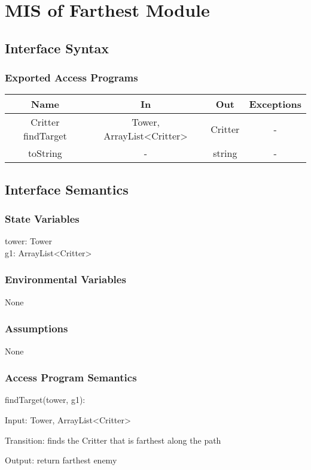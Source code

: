 \documentclass[12,english]{article}
\begin{document}
\section{MIS of Farthest Module}
	\subsection{Interface Syntax}
		\subsubsection{Exported Access Programs}
		
	\begin{tabular}[pos]{|c|c|c|c|}
	\hline
	\textbf{Name}& \textbf{In} & \textbf{Out} & \textbf{Exceptions} \\ 
	\hline
	Critter findTarget & Tower, ArrayList<Critter> & Critter & - \\ \hline
	toString & - & string & - \\ \hline
					
	\end{tabular}		
		
	\subsection{Interface Semantics}
		\subsubsection{State Variables}
		tower: Tower\\
	    g1: ArrayList<Critter>\\
		\subsubsection{Environmental Variables}
		None
		\subsubsection{Assumptions}
        None

		\subsubsection{Access Program Semantics}
		findTarget(tower, g1):
		
		Input: Tower, ArrayList<Critter>
		
		Transition: finds the Critter that is farthest along the path
		
		Output: return farthest enemy
		
\end{document}
